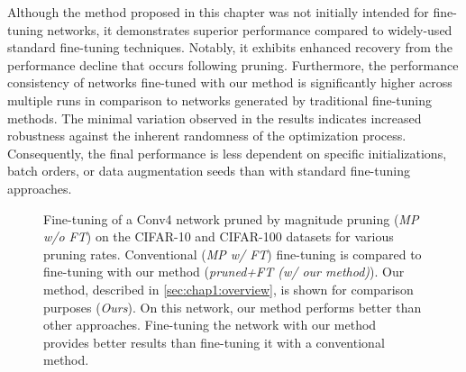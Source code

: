 Although the method proposed in this chapter was not initially intended for
fine-tuning networks, it demonstrates superior performance compared to
widely-used standard fine-tuning techniques. Notably, it exhibits enhanced
recovery from the performance decline that occurs following pruning.
Furthermore, the performance consistency of networks fine-tuned with our method
is significantly higher across multiple runs in comparison to networks generated
by traditional fine-tuning methods. The minimal variation observed in the
results indicates increased robustness against the inherent randomness of the
optimization process. Consequently, the final performance is less dependent on
specific initializations, batch orders, or data augmentation seeds than with
standard fine-tuning approaches.\\


\begin{figure}
  \centering
  \caption{ Fine-tuning of a Conv4 network pruned by magnitude pruning (\emph{MP
      w/o FT}) on the CIFAR-10 and CIFAR-100 datasets for various pruning rates.
    Conventional (\emph{MP w/ FT}) fine-tuning is compared to fine-tuning with our
    method (\emph{pruned+FT (w/ our method)}). Our method, described in
    \cref{sec:chap1:overview}, is shown for comparison purposes (\emph{Ours}). On
    this network, our method performs better than other approaches. Fine-tuning
    the network with our method provides better results than fine-tuning it with a
    conventional method.}
  \label{fig:chap1:finetuning_impact_conv4}
\end{figure}


